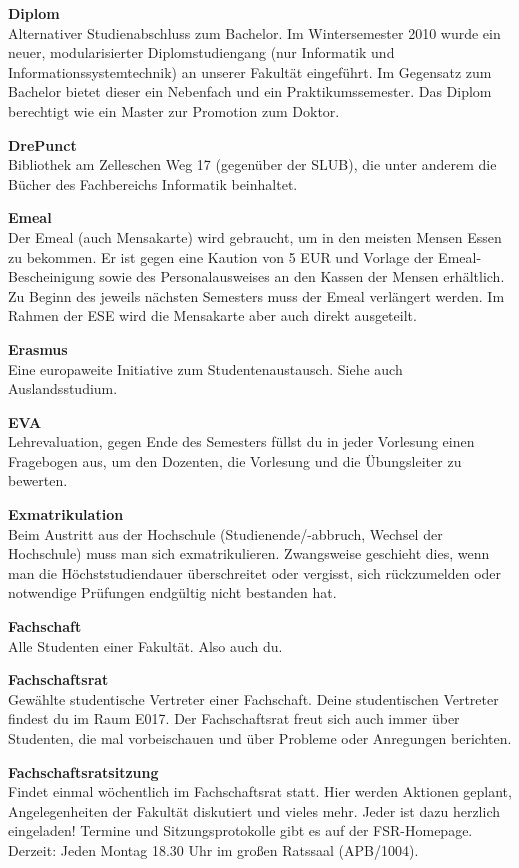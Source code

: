 \textbf{Diplom} \\
Alternativer Studienabschluss zum Bachelor.
Im Wintersemester 2010 wurde ein neuer, modularisierter Diplomstudiengang (nur Informatik und Informationssystemtechnik) an unserer Fakultät eingeführt.
Im Gegensatz zum Bachelor bietet dieser ein Nebenfach und ein Praktikumssemester.
Das Diplom berechtigt wie ein Master zur Promotion zum Doktor.

\textbf{DrePunct} \\
Bibliothek am Zelleschen Weg 17 (gegenüber der SLUB), die unter anderem die Bücher des Fachbereichs Informatik beinhaltet.

\textbf{Emeal} \\
Der Emeal (auch Mensakarte) wird gebraucht, um in den meisten Mensen Essen zu bekommen.
Er ist gegen eine Kaution von 5 EUR und Vorlage der Emeal-Bescheinigung sowie des Personalausweises an den Kassen der Mensen erhältlich.
Zu Beginn des jeweils nächsten Semesters muss der Emeal verlängert werden.
Im Rahmen der ESE wird die Mensakarte aber auch direkt ausgeteilt.

\textbf{Erasmus} \\
Eine europaweite Initiative zum Studentenaustausch.
Siehe auch Auslandsstudium.

\textbf{EVA} \\
Lehrevaluation, gegen Ende des Semesters füllst du in jeder Vorlesung einen Fragebogen aus, um den Dozenten, die Vorlesung und die Übungsleiter zu bewerten.

\textbf{Exmatrikulation} \\
Beim Austritt aus der Hochschule (Studienende/-abbruch, Wechsel der Hochschule) muss man sich exmatrikulieren.
Zwangsweise geschieht dies, wenn man die Höchststudiendauer überschreitet oder vergisst, sich rückzumelden oder notwendige Prüfungen endgültig nicht bestanden hat.

\textbf{Fachschaft} \\
Alle Studenten einer Fakultät. Also auch du.

\textbf{Fachschaftsrat} \\
Gewählte studentische Vertreter einer Fachschaft.
Deine studentischen Vertreter findest du im Raum E017.
Der Fachschaftsrat freut sich auch immer über Studenten, die mal vorbeischauen und über Probleme oder Anregungen berichten.

\textbf{Fachschaftsratsitzung} \\
Findet einmal wöchentlich im Fachschaftsrat statt.
Hier werden Aktionen geplant, Angelegenheiten der Fakultät diskutiert und vieles mehr.
Jeder ist dazu herzlich eingeladen!
Termine und Sitzungsprotokolle gibt es auf der FSR-Homepage.
Derzeit:
Jeden Montag 18.30 Uhr im großen Ratssaal (APB/1004).

